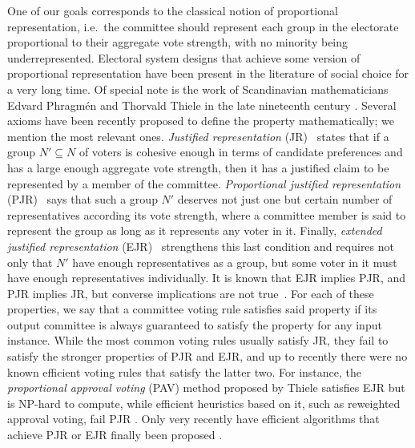 One of our goals corresponds to the classical notion of proportional representation, i.e.~the committee should represent each group in the electorate proportional to their aggregate vote strength, with no minority being underrepresented. 
Electoral system designs that achieve some version of proportional representation have been present in the literature of social choice for a very long time. Of special note is the work of Scandinavian mathematicians Edvard Phragm\'{e}n and Thorvald Thiele in the late nineteenth century \cite{phragmen1894methode, phragmen1895proportionella, phragmen1896theorie, phragmen1899till, thiele1895om, janson2016phragmen}. 
Several axioms have been recently proposed to define the property mathematically; we mention the most relevant ones. 
\emph{Justified representation} (JR)~\cite{aziz2017justified} states that if a group $N'\subseteq N$ of voters is cohesive enough in terms of candidate preferences and has a large enough aggregate vote strength, then it has a justified claim to be represented by a member of the committee.
\emph{Proportional justified representation} (PJR)~\cite{sanchez2017proportional} says that such a group $N'$ deserves not just one but certain number of representatives according its vote strength, where a committee member is said to represent the group as long as it represents any voter in it.
Finally, \emph{extended justified representation} (EJR)~\cite{aziz2017justified} strengthens this last condition and requires not only that $N'$ have enough representatives as a group, but some voter in it must have enough representatives individually.
It is known that EJR implies PJR, and PJR implies JR, but converse implications are not true~\cite{sanchez2017proportional}. %
For each of these properties, we say that a committee voting rule satisfies said property if its output committee is always guaranteed to satisfy the property for any input instance. 
While the most common voting rules usually satisfy JR, they fail to satisfy the stronger properties of PJR and EJR, and up to recently there were no known efficient voting rules that satisfy the latter two. 
For instance, the \emph{proportional approval voting} (PAV) method \cite{thiele1895om, janson2016phragmen} proposed by Thiele satisfies EJR but is NP-hard to compute, while efficient heuristics based on it, such as reweighted approval voting, fail PJR \cite{aziz2014computational, skowron2016finding, aziz2017justified}. 
Only very recently have efficient algorithms that achieve PJR or EJR finally been proposed \cite{brill2017phragmen, sanchez2016maximin, aziz2018complexity, peters2019proportionality}. 

